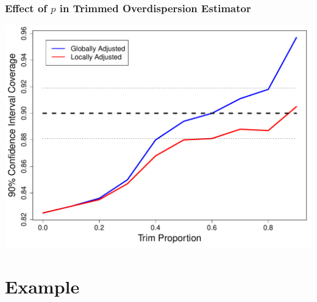 \documentclass[mathserif,compress]{beamer}\usepackage{graphicx, color}
\makeatletter
\def\maxwidth{ %
  \ifdim\Gin@nat@width>\linewidth
    \linewidth
  \else
    \Gin@nat@width
  \fi
}
\makeatother
\begin{document}
\begin{frame}[fragile]
\frametitle{Effect of $p$ in Trimmed Overdispersion Estimator}

\begin{center}
\includegraphics[width = .8\maxwidth]{figure/CI90TrimProp-plot}
\end{center}

\end{frame}


\section{Example}
\end{document}
